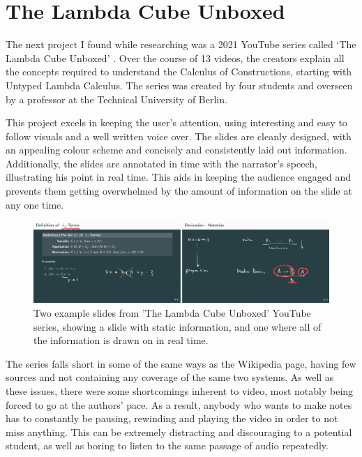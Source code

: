\documentclass{l4proj}
\begin{document}
\section{The Lambda Cube Unboxed}

The next project I found while researching was a 2021 YouTube series called `The Lambda Cube Unboxed' \citep{youtube}.  Over the course of 13 videos, the creators explain all the concepts required to understand the Calculus of Constructions, starting with Untyped Lambda Calculus.  The series was created by four students and overseen by a professor at the Technical University of Berlin.

This project excels in keeping the user's attention, using interesting and easy to follow visuals and a well written voice over.  The slides are cleanly designed, with an appealing colour scheme and concisely and consistently laid out information.  Additionally, the slides are annotated in time with the narrator's speech, illustrating his point in real time.  This aids in keeping the audience engaged and prevents them getting overwhelmed by the amount of information on the slide at any one time.

\begin{figure}[h!]
    \centering
    \includegraphics[width=1.0\linewidth]{dissertation/images/unboxed_merged.png}
    \caption{Two example slides from 'The Lambda Cube Unboxed' YouTube series, showing a slide with static information, and one where all of the information is drawn on in real time.}
    \label{fig:enter-label}
\end{figure}

The series falls short in some of the same ways as the Wikipedia page, having few sources and not containing any coverage of the same two systems.  As well as these issues, there were some shortcomings inherent to video, most notably being forced to go at the authors' pace.  As a result, anybody who wants to make notes has to constantly be pausing, rewinding and playing the video in order to not miss anything.  This can be extremely distracting and discouraging to a potential student, as well as boring to listen to the same passage of audio repeatedly.
\end{document}
